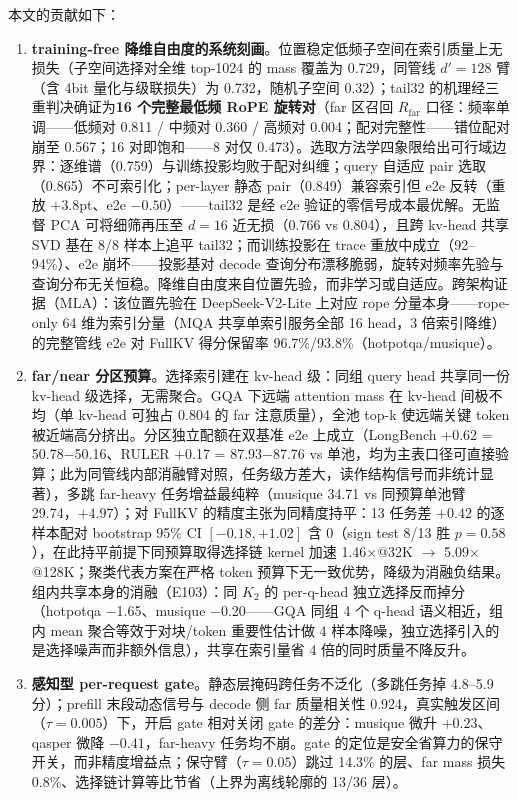 \documentclass[11pt]{article}
\begin{document}
本文的贡献如下：
\begin{enumerate}
\item \textbf{training-free 降维自由度的系统刻画}。位置稳定低频子空间在索引质量上无损失（子空间选择对全维 top-1024 的 mass 覆盖为 0.729，同管线 $d'{=}128$ 臂（含 4bit 量化与级联损失）为 0.732，随机子空间 0.32）；tail32 的机理经三重判决确证为\textbf{16 个完整最低频 RoPE 旋转对}（far 区召回 $R_{\mathrm{far}}$ 口径：频率单调——低频对 0.811 / 中频对 0.360 / 高频对 0.004；配对完整性——错位配对崩至 0.567；16 对即饱和——8 对仅 0.473）。选取方法学四象限给出可行域边界：逐维谱（0.759）与训练投影均败于配对纠缠；query 自适应 pair 选取（0.865）不可索引化；per-layer 静态 pair（0.849）兼容索引但 e2e 反转（重放 $+3.8$pt、e2e $-0.50$）——tail32 是经 e2e 验证的零信号成本最优解。无监督 PCA 可将细筛再压至 $d{=}16$ 近无损（0.766 vs 0.804），且跨 kv-head 共享 SVD 基在 8/8 样本上追平 tail32；而训练投影在 trace 重放中成立（92--94\%）、e2e 崩坏——投影基对 decode 查询分布漂移脆弱，旋转对频率先验与查询分布无关恒稳。降维自由度来自位置先验，而非学习或自适应。跨架构证据（MLA）：该位置先验在 DeepSeek-V2-Lite 上对应 rope 分量本身——rope-only 64 维为索引分量（MQA 共享单索引服务全部 16 head，3 倍索引降维）的完整管线 e2e 对 FullKV 得分保留率 96.7\%/93.8\%（hotpotqa/musique）。
\item \textbf{far/near 分区预算}。选择索引建在 kv-head 级：同组 query head 共享同一份 kv-head 级选择，无需聚合。GQA 下远端 attention mass 在 kv-head 间极不均（单 kv-head 可独占 0.804 的 far 注意质量），全池 top-k 使远端关键 token 被近端高分挤出。分区独立配额在双基准 e2e 上成立（LongBench +0.62 = 50.78$-$50.16、RULER +0.17 = 87.93$-$87.76 vs 单池，均为主表口径可直接验算；此为同管线内部消融臂对照，任务级方差大，读作结构信号而非统计显著），多跳 far-heavy 任务增益最纯粹（musique 34.71 vs 同预算单池臂 29.74，$+4.97$）；对 FullKV 的精度主张为同精度持平：13 任务差 $+0.42$ 的逐样本配对 bootstrap 95\% CI $[-0.18, +1.02]$ 含 0（sign test 8/13 胜 $p{=}0.58$），在此持平前提下同预算取得选择链 kernel 加速 1.46$\times$@32K $\rightarrow$ 5.09$\times$@128K；聚类代表方案在严格 token 预算下无一致优势，降级为消融负结果。组内共享本身的消融（E103）：同 $K_2$ 的 per-q-head 独立选择反而掉分（hotpotqa $-$1.65、musique $-$0.20——GQA 同组 4 个 q-head 语义相近，组内 mean 聚合等效于对块/token 重要性估计做 4 样本降噪，独立选择引入的是选择噪声而非额外信息），共享在索引量省 4 倍的同时质量不降反升。
\item \textbf{感知型 per-request gate}。静态层掩码跨任务不泛化（多跳任务掉 4.8--5.9 分）；prefill 末段动态信号与 decode 侧 far 质量相关性 0.924，真实触发区间（$\tau{=}0.005$）下，开启 gate 相对关闭 gate 的差分：musique 微升 $+0.23$、qasper 微降 $-0.41$，far-heavy 任务均不崩。gate 的定位是安全省算力的保守开关，而非精度增益点；保守臂（$\tau{=}0.05$）跳过 14.3\% 的层、far mass 损失 0.8\%、选择链计算等比节省（上界为离线轮廓的 13/36 层）。

\end{enumerate}
\end{document}

